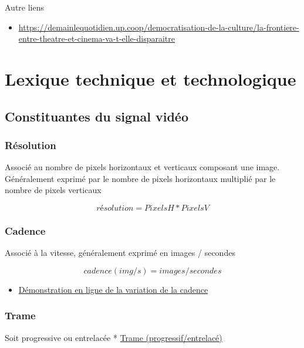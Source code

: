 \documentclass[
  french,
]{book}
\providecommand{\tightlist}{%
  \setlength{\itemsep}{0pt}\setlength{\parskip}{0pt}}
\begin{document}
Autre liens

\begin{itemize}
\tightlist
\item
  \url{https://demainlequotidien.up.coop/democratisation-de-la-culture/la-frontiere-entre-theatre-et-cinema-va-t-elle-disparaitre}
\end{itemize}

\hypertarget{lexique}{%
\chapter{Lexique technique et technologique}\label{lexique}}

\hypertarget{lexique_composantes}{%
\section{Constituantes du signal vidéo}\label{lexique_composantes}}

\hypertarget{ruxe9solution}{%
\subsection{Résolution}\label{ruxe9solution}}

Associé au nombre de pixels horizontaux et verticaux composant une image.
Généralement exprimé par le nombre de pixels horizontaux multiplié par le nombre de pixels verticaux

\[
résolution  = PixelsH * PixelsV 
\]

\hypertarget{cadence}{%
\subsection{Cadence}\label{cadence}}

Associé à la vitesse, généralement exprimé en images / secondes

\[
cadence (img/s) = images / secondes
\]

\begin{itemize}
\tightlist
\item
  \href{https://frames-per-second.appspot.com}{Démonstration en ligne de la variation de la cadence}
\end{itemize}

\hypertarget{trame}{%
\subsection{Trame}\label{trame}}

Soit progressive ou entrelacée
* \href{https://web.archive.org/web/20140222010640/http://neuron2.net/LVG/interlacing.html}{Trame (progressif/entrelacé)}
\end{document}
